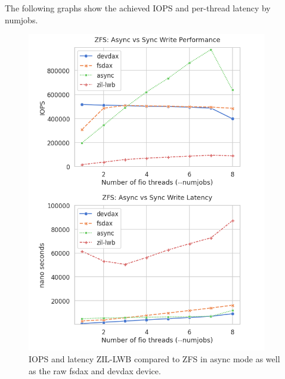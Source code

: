 \documentclass[12pt,a4paper,twoside]{book}
\begin{document}
The following graphs show the achieved IOPS and per-thread latency by numjobs.

\begin{figure}[H]
    \centering
    \includegraphics[height=14cm]{fig/evaluation/motivating_fio_benchmark__iops_and_latency.png}
    \caption{IOPS and latency ZIL-LWB compared to ZFS in async mode as well as the raw fsdax and devdax device.}
    \label{fig:lwbanalysis:iops_and_latency}
\end{figure}
\end{document}
